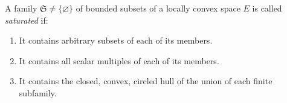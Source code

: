 A family \(\mathfrak{S} \neq \{\varnothing\}\) of bounded subsets of a locally convex space \(E\) is called \textit{saturated} if:
\begin{enumerate}
\item It contains arbitrary subsets of each of its members.
\item It contains all scalar multiples of each of its members.
\item It contains the closed, convex, circled hull of the union of each finite subfamily.
\end{enumerate}
